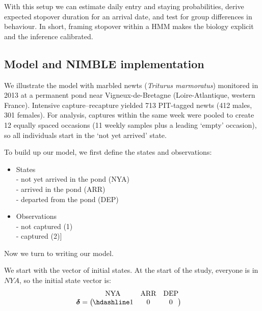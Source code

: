 \documentclass[
  12pt,
]{krantz}
\begin{document}
With this setup we can estimate daily entry and staying probabilities, derive expected stopover duration for an arrival date, and test for group differences in behaviour. In short, framing stopover within a HMM makes the biology explicit and the inference calibrated.

\subsection{Model and NIMBLE implementation}\label{model-and-nimble-implementation-8}

We illustrate the model with marbled newts (\emph{Triturus marmoratus}) monitored in 2013 at a permanent pond near Vigneux-de-Bretagne (Loire-Atlantique, western France). Intensive capture--recapture yielded 713 PIT-tagged newts (412 males, 301 females). For analysis, captures within the same week were pooled to create 12 equally spaced occasions (11 weekly samples plus a leading `empty' occasion), so all individuals start in the `not yet arrived' state.

To build up our model, we first define the states and observations:

\begin{itemize}
\item
  States\\
  - not yet arrived in the pond (NYA)\\
  - arrived in the pond (ARR)\\
  - departed from the pond (DEP)
\item
  Observations\\
  - not captured (1)\\
  - captured (2){]}
\end{itemize}

Now we turn to writing our model.

We start with the vector of initial states. At the start of the study, everyone is in \(NYA\), so the initial state vector is:
\[
\begin{matrix}
& \\
\boldsymbol{\delta} =
\left ( \vphantom{ \begin{matrix} 1 \end{matrix} } \right .
\end{matrix}
\hspace{-1.2em}
\begin{matrix}
\text{NYA} & \text{ARR} & \text{DEP} \\ \hdashline
1 & 0 & 0
\end{matrix}
\hspace{-0.2em}
\begin{matrix}
& \\
\left . \vphantom{ \begin{matrix} 1 \end{matrix} } \right )
\end{matrix}
\]
\end{document}
